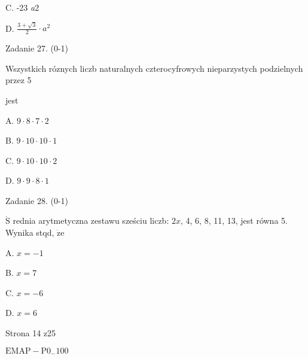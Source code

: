 \documentclass[a4paper,12pt]{article}
\begin{document}
C. -23 {\it a}2

D. $\displaystyle \frac{3+\sqrt{3}}{2}\cdot a^{2}$

Zadanie 27. (0-1)

Wszystkich róznych liczb naturalnych czterocyfrowych nieparzystych podzielnych przez 5

jest

A. $9\cdot 8\cdot 7\cdot 2$

B. $9\cdot 10\cdot 10\cdot 1$

C. $9\cdot 10\cdot 10\cdot 2$

D. $9\cdot 9\cdot 8\cdot 1$

Zadanie 28. (0-1)

$\acute{\mathrm{S}}$ rednia arytmetyczna zestawu sześciu liczb: $2x$, 4, 6, 8, 11, 13, jest równa 5. Wynika stqd, $\dot{\mathrm{z}}\mathrm{e}$

A. $x=-1$

B. $x=7$

C. $x=-6$

D. $x=6$

Strona 14 z25

$\mathrm{E}\mathrm{M}\mathrm{A}\mathrm{P}-\mathrm{P}0_{-}100$
\end{document}
